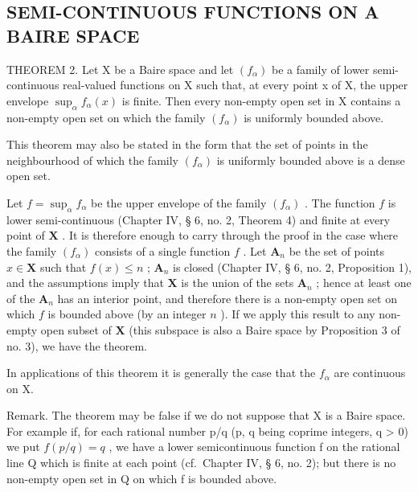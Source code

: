 \subsection{SEMI-CONTINUOUS FUNCTIONS ON A BAIRE SPACE}

THEOREM 2. Let X be a Baire space and let \((f_{\alpha})\) be a family of lower semi-continuous real-valued functions on X such that, at every point x of X, the upper envelope \(\sup_{\alpha} f_{\alpha}(x)\) is finite. Then every non-empty open set in X contains a non-empty open set on which the family \((f_{\alpha})\) is uniformly bounded above.

This theorem may also be stated in the form that the set of points in the neighbourhood of which the family \((f_{\alpha})\) is uniformly bounded above is a dense open set.

Let \(f = \sup_{\alpha} f_{\alpha}\) be the upper envelope of the family \((f_{\alpha})\) . The function \(f\) is lower semi-continuous (Chapter IV, § 6, no. 2, Theorem 4) and finite at every point of \(\mathbf{X}\) . It is therefore enough to carry through the proof in the case where the family \((f_{\alpha})\) consists of a single function \(f\) . Let \(\mathbf{A}_n\) be the set of points \(x \in \mathbf{X}\) such that \(f(x) \leqslant n\) ; \(\mathbf{A}_n\) is closed (Chapter IV, § 6, no. 2, Proposition 1), and the assumptions imply that \(\mathbf{X}\) is the union of the sets \(\mathbf{A}_n\) ; hence at least one of the \(\mathbf{A}_n\) has an interior point, and therefore there is a non-empty open set on which \(f\) is bounded above (by an integer \(n\) ). If we apply this result to any non-empty open subset of \(\mathbf{X}\) (this subspace is also a Baire space by Proposition 3 of no. 3), we have the theorem.

In applications of this theorem it is generally the case that the \(f_{\alpha}\) are continuous on X.

Remark. The theorem may be false if we do not suppose that X is a Baire space. For example if, for each rational number p/q (p, q being coprime integers, q \textgreater{} 0) we put \(f(p/q) = q\) , we have a lower semicontinuous function f on the rational line Q which is finite at each point (cf.~Chapter IV, § 6, no. 2); but there is no non-empty open set in Q on which f is bounded above.

